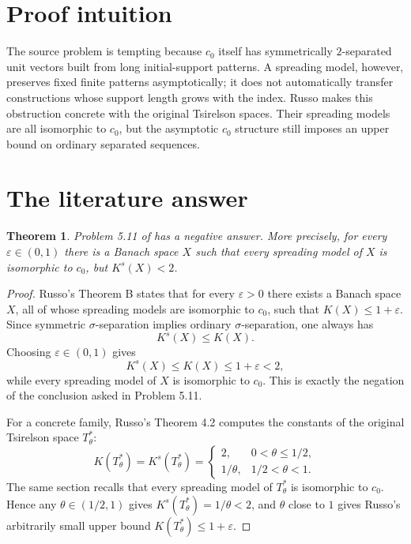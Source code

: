 \documentclass[11pt]{article}
\newtheorem{theorem}{Theorem}
\newcommand{\cnull}{c_0}
\newcommand{\Ks}{K^s}
\begin{document}
\section*{Proof intuition}

The source problem is tempting because \(\cnull\) itself has symmetrically
\(2\)-separated unit vectors built from long initial-support patterns.  A
spreading model, however, preserves fixed finite patterns asymptotically; it
does not automatically transfer constructions whose support length grows with
the index.  Russo makes this obstruction concrete with the original
Tsirelson spaces.  Their spreading models are all isomorphic to \(\cnull\),
but the asymptotic \(\cnull\) structure still imposes an upper bound on
ordinary separated sequences.

\section*{The literature answer}

\begin{theorem}
Problem 5.11 of \cite{HKR} has a negative answer.  More precisely, for every
\(\varepsilon\in(0,1)\) there is a Banach space \(X\) such that every spreading
model of \(X\) is isomorphic to \(\cnull\), but \(\Ks(X)<2\).
\end{theorem}

\begin{proof}
Russo's Theorem B \cite{Russo} states that for every \(\varepsilon>0\) there
exists a Banach space \(X\), all of whose spreading models are isomorphic to
\(\cnull\), such that \(K(X)\leq 1+\varepsilon\).  Since symmetric
\(\sigma\)-separation implies ordinary \(\sigma\)-separation, one always has
\[
  \Ks(X)\leq K(X).
\]
Choosing \(\varepsilon\in(0,1)\) gives
\[
  \Ks(X)\leq K(X)\leq 1+\varepsilon<2,
\]
while every spreading model of \(X\) is isomorphic to \(\cnull\).  This is
exactly the negation of the conclusion asked in Problem 5.11.

For a concrete family, Russo's Theorem 4.2 computes the constants of the
original Tsirelson space \(T^*_\theta\):
\[
  K(T^*_\theta)=\Ks(T^*_\theta)=
  \begin{cases}
    2, & 0<\theta\leq 1/2,\\
    1/\theta, & 1/2<\theta<1.
  \end{cases}
\]
The same section recalls that every spreading model of \(T^*_\theta\) is
isomorphic to \(\cnull\).  Hence any \(\theta\in(1/2,1)\) gives
\(\Ks(T^*_\theta)=1/\theta<2\), and \(\theta\) close to \(1\) gives Russo's
arbitrarily small upper bound \(K(T^*_\theta)\leq 1+\varepsilon\).
\end{proof}
\end{document}
